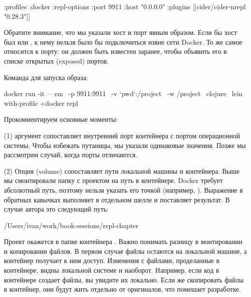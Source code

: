 \begin{english}
  \begin{clojure}
:profiles
{:docker
 {:repl-options {:port 9911
                 :host "0.0.0.0"}
  :plugins [[cider/cider-nrepl "0.28.3"]]}}
  \end{clojure}
\end{english}

Обратите внимание, что мы указали хост и порт явным образом. Если бы хост был  или , к нему нельзя было бы подключиться извне сети Docker. То же самое относится к порту: он должен быть известен заранее, чтобы объявить его в списке открытых (exposed) портов.

Команда для запуска образа:

\begin{english}
  \begin{bash}
docker run -it~---rm \
  -p 9911:9911 \
  -v `pwd`:/project \
  -w /project \
  clojure \
  lein with-profile +docker repl
  \end{bash}
\end{english}

Прокомментируем основные моменты:

(1) аргумент  сопоставляет внутренний порт контейнера с портом операционной системы. Чтобы избежать путаницы, мы указали одинаковые значения. Позже мы рассмотрим случай, когда порты отличаются.

(2) Опция  (volume) сопоставляет пути локальной машины и контейнера. Выше мы смонтировали папку с проектом на путь  в контейнере. Docker требует абсолютный путь, поэтому нельзя указать его точкой (например, ). Выражение  в обратных кавычках выполняет  в отдельном шелле и поставляет результат. В случае автора это следующий путь:

\begin{english}
  \begin{text}
/Users/ivan/work/book-sessions/repl-chapter
  \end{text}
\end{english}

Проект окажется в папке контейнера . Важно понимать разницу в монтировании и копировании файлов. В первом случае файлы остаются на локальной машине, а контейнер получает к ним доступ. Изменения с файлами, проделанные в контейнере, видны локальной системе и наоборот. Например, если код в контейнере создает файлы, вы увидите их локально. Если же скопировать файлы в контейнер, они будут жить отдельно от оригиналов, что помешает разработке.

